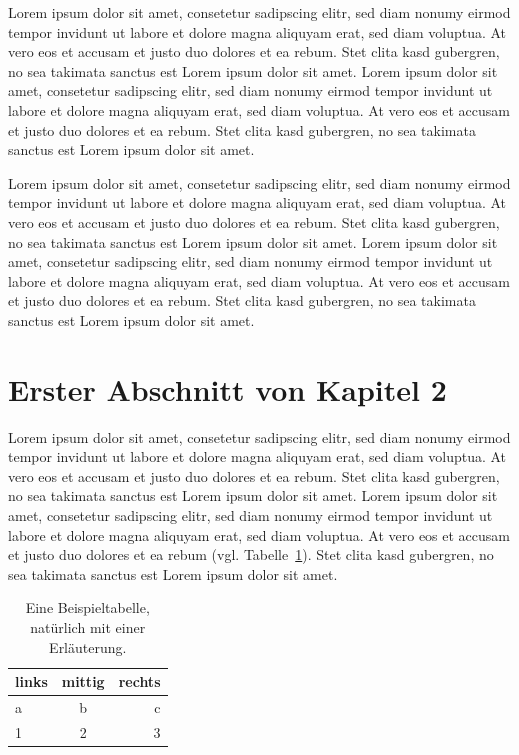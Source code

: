 Lorem ipsum dolor sit amet, consetetur sadipscing elitr, sed diam nonumy eirmod tempor invidunt ut labore et dolore magna aliquyam erat, sed diam voluptua. At vero eos et accusam et justo duo dolores et ea rebum. Stet clita kasd gubergren, no sea takimata sanctus est Lorem ipsum dolor sit amet. Lorem ipsum dolor sit amet, consetetur sadipscing elitr, sed diam nonumy eirmod tempor invidunt ut labore et dolore magna aliquyam erat, sed diam voluptua. At vero eos et accusam et justo duo dolores et ea rebum. Stet clita kasd gubergren, no sea takimata sanctus est Lorem ipsum dolor sit amet.

Lorem ipsum dolor sit amet, consetetur sadipscing elitr, sed diam nonumy eirmod tempor invidunt ut labore et dolore magna aliquyam erat, sed diam voluptua. At vero eos et accusam et justo duo dolores et ea rebum. Stet clita kasd gubergren, no sea takimata sanctus est Lorem ipsum dolor sit amet. Lorem ipsum dolor sit amet, consetetur sadipscing elitr, sed diam nonumy eirmod tempor invidunt ut labore et dolore magna aliquyam erat, sed diam voluptua. At vero eos et accusam et justo duo dolores et ea rebum. Stet clita kasd gubergren, no sea takimata sanctus est Lorem ipsum dolor sit amet.
\section{Erster Abschnitt von Kapitel 2}
Lorem ipsum dolor sit amet, consetetur sadipscing elitr, sed diam nonumy eirmod tempor invidunt ut labore et dolore magna aliquyam erat, sed diam voluptua. At vero eos et accusam et justo duo dolores et ea rebum. Stet clita kasd gubergren, no sea takimata sanctus est Lorem ipsum dolor sit amet. Lorem ipsum dolor sit amet, consetetur sadipscing elitr, sed diam nonumy eirmod tempor invidunt ut labore et dolore magna aliquyam erat, sed diam voluptua. At vero eos et accusam et justo duo dolores et ea rebum (vgl. Tabelle~\ref{tab:beispiel}). Stet clita kasd gubergren, no sea takimata sanctus est Lorem ipsum dolor sit amet.



\begin{table}
  \centering
  \begin{tabular}{l|c|r}
	links & mittig & rechts\\\hline
	a & b & c\\
	1 & 2 & 3  
  \end{tabular}
  \caption{Eine Beispieltabelle, natürlich mit einer Erläuterung.}
  \label{tab:beispiel}
\end{table}

